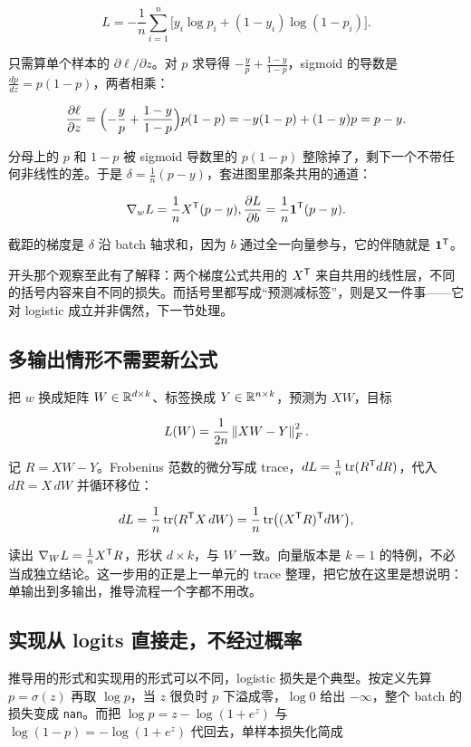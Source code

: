 \[
L=-\frac1n\sum_{i=1}^n\bigl[y_i\log p_i+(1-y_i)\log(1-p_i)\bigr].
\]

只需算单个样本的 \(\partial\ell/\partial z\)。对 \(p\) 求导得 \(-\frac yp+\frac{1-y}{1-p}\)，sigmoid 的导数是 \(\frac{dp}{dz}=p(1-p)\)，两者相乘：

\[
\frac{\partial\ell}{\partial z}
=\Bigl(-\frac yp+\frac{1-y}{1-p}\Bigr)p(1-p)
=-y(1-p)+(1-y)p
=p-y.
\]

分母上的 \(p\) 和 \(1-p\) 被 sigmoid 导数里的 \(p(1-p)\) 整除掉了，剩下一个不带任何非线性的差。于是 \(\delta=\frac1n(p-y)\)，套进图里那条共用的通道：

\[
\nabla_wL=\frac1nX^{\mathsf{T}}(p-y),
\space
\frac{\partial L}{\partial b}=\frac1n\mathbf1^{\mathsf{T}}(p-y).
\]

截距的梯度是 \(\delta\) 沿 batch 轴求和，因为 \(b\) 通过全一向量参与，它的伴随就是 \(\mathbf1^{\mathsf{T}}\)。

开头那个观察至此有了解释：两个梯度公式共用的 \(X^{\mathsf{T}}\) 来自共用的线性层，不同的括号内容来自不同的损失。而括号里都写成``预测减标签''，则是又一件事——它对 logistic 成立并非偶然，下一节处理。

\subsection{多输出情形不需要新公式}

把 \(w\) 换成矩阵 \(W\in\mathbb{R}^{d\times k}\)、标签换成 \(Y\in\mathbb{R}^{n\times k}\)，预测为 \(XW\)，目标

\[
L(W)=\frac1{2n}\left\lVert XW-Y\right\rVert_F^2.
\]

记 \(R=XW-Y\)。Frobenius 范数的微分写成 trace，\(dL=\frac1n\operatorname{tr}(R^{\mathsf{T}}dR)\)，代入 \(dR=X\,dW\) 并循环移位：

\[
dL=\frac1n\operatorname{tr}(R^{\mathsf{T}}X\,dW)=\frac1n\operatorname{tr}\bigl((X^{\mathsf{T}}R)^{\mathsf{T}}dW\bigr),
\]

读出 \(\nabla_WL=\frac1nX^{\mathsf{T}}R\)，形状 \(d\times k\)，与 \(W\) 一致。向量版本是 \(k=1\) 的特例，不必当成独立结论。这一步用的正是上一单元的 trace 整理，把它放在这里是想说明：单输出到多输出，推导流程一个字都不用改。

\subsection{实现从 logits 直接走，不经过概率}

推导用的形式和实现用的形式可以不同，logistic 损失是个典型。按定义先算 \(p=\sigma(z)\) 再取 \(\log p\)，当 \(z\) 很负时 \(p\) 下溢成零，\(\log 0\) 给出 \(-\infty\)，整个 batch 的损失变成 \texttt{nan}。而把 \(\log p=z-\log(1+e^z)\) 与 \(\log(1-p)=-\log(1+e^z)\) 代回去，单样本损失化简成

